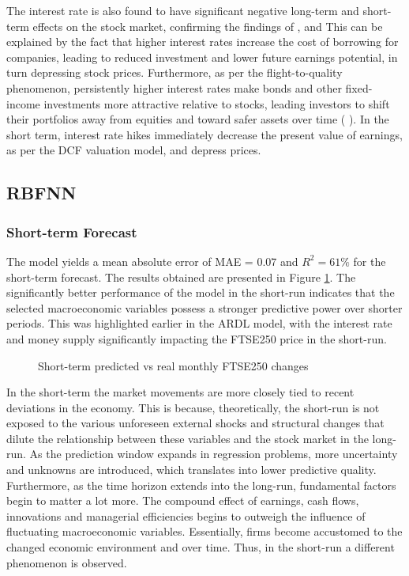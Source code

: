 \documentclass[11pt,a4paper]{article}
\newcommand{\citeboth}[1]{\citeauthor{#1} \citep{#1}}
\begin{document}
The interest rate is also found to have significant negative long-term and short-term effects on the stock market, confirming the findings of \citeboth{alam2009}, \citeboth{demir2019} and \citeboth{neifar2023}
This can be explained by the fact that higher interest 
rates increase the cost of borrowing for companies, leading to reduced investment 
and lower future earnings potential, in turn depressing stock prices. 
Furthermore, as per the flight-to-quality phenomenon, persistently higher interest rates make bonds and other fixed-income 
investments more attractive relative to stocks, leading investors to shift 
their portfolios away from equities and toward safer assets over time (\citeboth{asgharian2016}). 
In the short term, interest rate hikes immediately decrease the present value of earnings, as per the 
DCF valuation model, and depress prices.




\subsection{RBFNN}

\subsubsection{Short-term Forecast}


The model yields a mean absolute error of MAE = $0.07$ and 
$R^2 = 61\%$ for the short-term forecast. The results obtained are presented in Figure \ref{fig:shortmonthly}.
The significantly better performance of the model in the short-run
indicates that the selected macroeconomic variables possess
a stronger predictive power over shorter periods. This was highlighted 
earlier in the ARDL model, with the interest rate and money supply significantly
impacting the FTSE250 price in the short-run.



\begin{figure}[H]
    \centering
    \hspace*{-1.5cm}
      
    \caption{Short-term predicted vs real monthly FTSE250 changes}
    \label{fig:shortmonthly}
\end{figure}



In the short-term the market movements
are more closely tied to recent deviations in the economy. This is because,
theoretically, 
the short-run is not exposed to the various unforeseen external shocks and structural changes
that dilute the relationship between these variables and the stock market in the 
long-run. As the prediction window expands in regression problems, 
more uncertainty and unknowns are introduced, which translates into 
lower predictive quality. Furthermore, as the time horizon extends into the long-run, fundamental factors 
begin to matter a lot more. The compound effect of earnings, cash flows,
innovations and managerial efficiencies begins to outweigh the 
influence of fluctuating macroeconomic variables. Essentially, firms become accustomed 
to the changed economic environment and over time. Thus, in the short-run 
a different phenomenon is observed.
\end{document}
